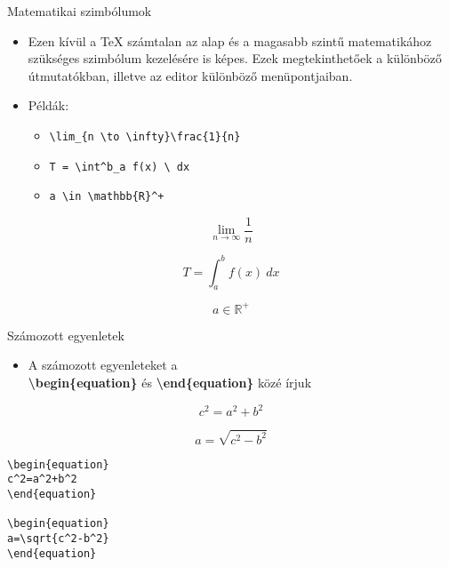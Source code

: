 \documentclass[11pt]{beamer}
\newcommand{\tbs}{\textbackslash}
\begin{document}
\begin{frame}[fragile]{Matematikai szimbólumok}
\begin{itemize}
\item Ezen kívül a \TeX{} számtalan az alap és a magasabb szintű matematikához szükséges szimbólum kezelésére is képes. Ezek megtekinthetőek a különböző útmutatókban, illetve az editor különböző menüpontjaiban.
\item Példák:
	\begin{itemize}
	\item	\verb|\lim_{n \to \infty}\frac{1}{n}|
	\item 	\verb|T = \int^b_a f(x) \ dx|
	\item 	\verb|a \in \mathbb{R}^+|
	\end{itemize}
\end{itemize}

$$\lim_{n \to \infty}\frac{1}{n}$$

$$T = \int^b_a f(x) \ dx$$

$$a \in \mathbb{R}^+$$

\end{frame}

\begin{frame}[fragile]{Számozott egyenletek}
\begin{itemize}
\item A számozott egyenleteket a\\ \textbf{\tbs begin\{equation\}} és \textbf{\tbs end\{equation\}} közé írjuk
\end{itemize}

\begin{equation}
c^2=a^2+b^2
\end{equation}

\begin{equation}
a=\sqrt{c^2-b^2}
\end{equation}

\begin{verbatim}
\begin{equation}
c^2=a^2+b^2
\end{equation}

\begin{equation}
a=\sqrt{c^2-b^2}
\end{equation}
\end{verbatim}
\end{frame}
\end{document}

